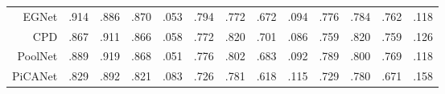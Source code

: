 \begin{table}[!ht]
{\begin{tabular}{rcccccccccccc}
			
			EGNet   \upcite{zhao2019egnet}
			& .914 & .886 & .870 & .053 
			& .794 & .772 & .672 & .094 
			& .776 & .784 & .762 & .118 
			\\ 
			
			CPD  \upcite{wu2019cascaded}
			& .867 & .911 & .866 & .058 
			& .772 & .820 & .701 & .086 
			& .759 & .820 & .759 & .126 \\
			
			PoolNet \upcite{liu2019simple}
			& .889 & .919 & .868 & .051 
			& .776 & .802 & .683 & .092 
			& .789 & .800 & .769 & .118 \\
			
			PiCANet \upcite{liu2018picanet}
			& .829 & .892 & .821 & .083 
			& .726 & .781 & .618 & .115 
			& .729 & .780 & .671 & .158 \\
			
			
			\bottomrule[2pt] %
		\end{tabular}
	}
\end{table}
%
%




